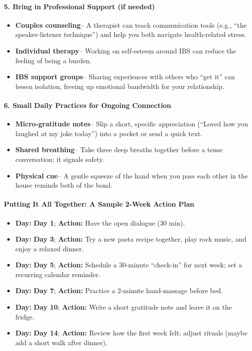 \begin{persistbenchsample}[title={GPT-OSS-120B -- Cos Similarity Partitioned -> Partitioned -- Sample 2 (+3 Improvement)}]
\paragraph{5. Bring in Professional Support (if needed)}
\begin{itemize}
  \item \textbf{Couples counseling}-- A therapist can teach communication tools (e.g., ``the speaker-listener technique'') and help you both navigate health-related stress.
  \item \textbf{Individual therapy}-- Working on self-esteem around IBS can reduce the feeling of being a burden.
  \item \textbf{IBS support groups}-- Sharing experiences with others who ``get it'' can lessen isolation, freeing up emotional bandwidth for your relationship.
\end{itemize}

\paragraph{6. Small Daily Practices for Ongoing Connection}
\begin{itemize}
  \item \textbf{Micro-gratitude notes}-- Slip a short, specific appreciation (``Loved how you laughed at my joke today'') into a pocket or send a quick text.
  \item \textbf{Shared breathing}-- Take three deep breaths together before a tense conversation; it signals safety.
  \item \textbf{Physical cue}-- A gentle squeeze of the hand when you pass each other in the house reminds both of the bond.
\end{itemize}

\paragraph{Putting It All Together: A Sample 2-Week Action Plan}
\begin{itemize}
  \item \textbf{Day:} \textbf{Day 1}; \textbf{Action:} Have the open dialogue (30 min).
  \item \textbf{Day:} \textbf{Day 3}; \textbf{Action:} Try a new pasta recipe together, play rock music, and enjoy a relaxed dinner.
  \item \textbf{Day:} \textbf{Day 5}; \textbf{Action:} Schedule a 30-minute ``check-in'' for next week; set a recurring calendar reminder.
  \item \textbf{Day:} \textbf{Day 7}; \textbf{Action:} Practice a 2-minute hand-massage before bed.
  \item \textbf{Day:} \textbf{Day 10}; \textbf{Action:} Write a short gratitude note and leave it on the fridge.
  \item \textbf{Day:} \textbf{Day 14}; \textbf{Action:} Review how the first week felt; adjust rituals (maybe add a short walk after dinner).
\end{itemize}


\end{persistbenchsample}
